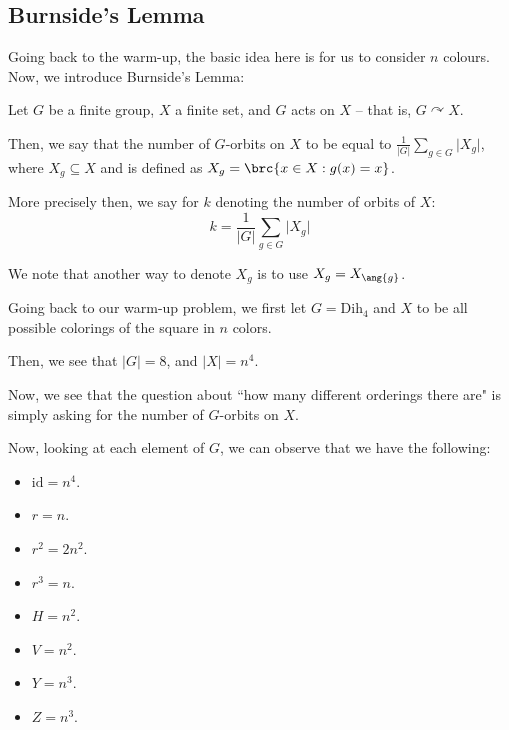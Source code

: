 \documentclass[openany]{book}
\begin{document}
\subsection{Burnside's Lemma}
Going back to the warm-up, the basic idea here is for us to consider $n$ colours. Now, we introduce Burnside's Lemma:

\begin{lem}
	Let $G$ be a finite group, $X$ a finite set, and $G$ acts on $X$ -- that is, $G \curvearrowright X$.
	
	Then, we say that the number of $G$-orbits on $X$ to be equal to $\frac{1}{\lvert G \rvert} \sum_{g \in G} \lvert X_g \rvert$, where $X_g \subseteq X$ and is defined as $X_g = \brc{x \in X : g(x) = x}$.
	
	More precisely then, we say for $k$ denoting the number of orbits of $X$:
	\begin{equation*}
		k = \frac{1}{\lvert G \rvert}\sum_{g \in G} \lvert X_g \rvert
	\end{equation*}
\end{lem}
\begin{rmk}
	We note that another way to denote $X_g$ is to use $X_g = X_{\ang{g}}$.
\end{rmk}

\begin{example}
	Going back to our warm-up problem, we first let $G = \mathrm{Dih}_4$ and $X$ to be all possible colorings of the square in $n$ colors.
	
	Then, we see that $\lvert G \rvert = 8$, and $\lvert X \rvert = n^{4}$.
	
	Now, we see that the question about ``how many different orderings there are" is simply asking for the number of $G$-orbits on $X$.
	
	Now, looking at each element of $G$, we can observe that we have the following:
	\begin{itemize}
		\item $\mathrm{id} = n^{4}$.
		\item $r = n$.
		\item $r^{2} = 2n^{2}$.
		\item $r^{3} = n$.
		\item $H = n^{2}$.
		\item $V = n^{2}$.
		\item $Y = n^{3}$.
		\item $Z = n^{3}$.
	\end{itemize}
\end{example}
\end{document}
